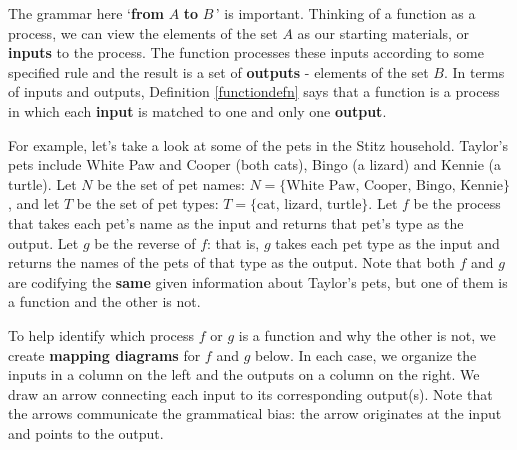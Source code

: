 \documentclass{ximera}
\begin{document}

\medskip

The grammar here `\textbf{from} $A$ \textbf{to} $B\,$'  is important.  Thinking of a function as a process, we can view the elements of the set $A$ as our starting materials, or \textbf{inputs} to the process.  The function  processes these inputs according to some specified rule and the result is a set of  \textbf{outputs}  - elements of the set $B$. In terms of inputs and outputs, Definition \ref{functiondefn}  says that a function is a process in which each \textbf{input} is matched to one and only one \textbf{output}.

\medskip

For example, let's take a look at some of the pets in the Stitz household.  Taylor's pets include White Paw and Cooper (both cats), Bingo (a lizard) and Kennie (a turtle).  Let $N$ be the set of pet names: $N = \{ \text{White Paw, Cooper, Bingo, Kennie} \}$, and let $T$ be the set of pet types:  $T = \{ \text{cat, lizard, turtle} \}$.   Let $f$ be the process that takes each pet's name as the input and returns that pet's type as the output. Let $g$ be the reverse of $f$:  that is, $g$ takes each pet type as the input and returns the names of the pets of that type as the output.   Note that both $f$ and $g$ are codifying the \textbf{same} given information about Taylor's pets,  but one of them is a function and the other is not.  

\medskip

To help identify which process $f$ or $g$ is a function and  why the other is not, we create   \textbf{mapping diagrams} for $f$ and $g$ below.  In each case, we organize the inputs in a column on the left and the outputs on a column on the right.  We draw an arrow connecting each input to its corresponding output(s).  Note that the arrows communicate the grammatical bias: the arrow originates at the input and points to the output.

\medskip
\end{document}
